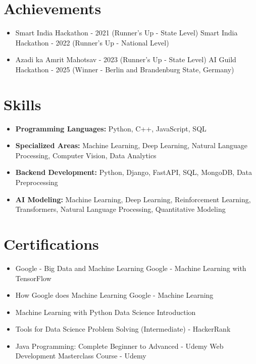 \documentclass[a4paper,10pt]{article}
\begin{document}
\section*{Achievements}
\begin{itemize}
\item Smart India Hackathon - 2021 (Runner's Up - State Level) \hfill Smart India Hackathon - 2022 (Runner's Up - National Level)
\item Azadi ka Amrit Mahotsav - 2023 (Runner's Up - State Level) \hfill AI Guild Hackathon - 2025 (Winner - Berlin and Brandenburg State, Germany)
\end{itemize}

\section*{Skills}
\begin{itemize}
  \item \textbf{Programming Languages:} Python, C++, JavaScript, SQL
  \item \textbf{Specialized Areas:} Machine Learning, Deep Learning, Natural Language Processing, Computer Vision, Data Analytics
  \item \textbf{Backend Development:} Python, Django, FastAPI, SQL, MongoDB, Data Preprocessing
  \item \textbf{AI Modeling:} Machine Learning, Deep Learning, Reinforcement Learning, Transformers, Natural Language Processing, Quantitative Modeling
\end{itemize}

\section*{Certifications}
\begin{itemize}
\item Google - Big Data and Machine Learning \hfill Google - Machine Learning with TensorFlow
\item How Google does Machine Learning \hfill Google - Machine Learning
\item Machine Learning with Python \hfill Data Science Introduction
\item Tools for Data Science \hfill Problem Solving (Intermediate) - HackerRank
\item Java Programming: Complete Beginner to Advanced - Udemy \hfill Web Development Masterclass Course - Udemy
\end{itemize}
\end{document}
